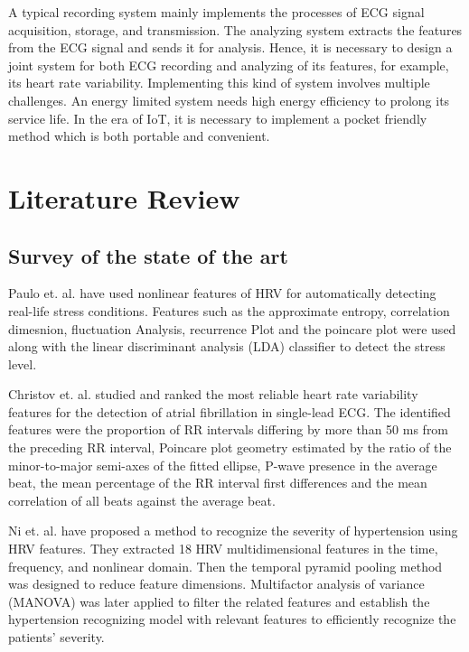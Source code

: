 \documentclass[11pt]{article}
\theoremstyle{definition}
\begin{document}
  A typical recording system mainly implements the processes of ECG signal acquisition, storage, and transmission.
  The analyzing system extracts the features from the ECG signal and sends it for analysis.
  Hence, it is necessary to design a joint system for both ECG recording and analyzing of its features, for example, its heart rate variability. Implementing this kind of system involves multiple challenges.
  An energy limited system needs high energy efficiency to prolong its service life.
  In the era of IoT, it is necessary to implement a pocket friendly method which is both portable and convenient.


  \section{Literature Review}
  \subsection{Survey of the state of the art}
  Paulo et. al.\cite{melillo_nonlinear_2011} have used nonlinear features of HRV for automatically detecting real-life stress conditions. Features such as the approximate entropy, correlation dimesnion, fluctuation Analysis, recurrence Plot and the poincare plot were used along with the linear discriminant analysis (LDA) classifier to detect the stress level.
  
  Christov et. al. \cite{christov_ranking_2018} studied and ranked the most reliable heart rate variability features for the detection of atrial fibrillation in single-lead ECG. The identified features were the proportion of RR intervals differing by more than 50 ms from the preceding RR interval, Poincare plot geometry estimated by the ratio of the minor-to-major semi-axes of the fitted ellipse, P-wave presence in the average beat, the mean percentage of the RR interval first differences and the mean correlation of all beats against the average beat. 
  
  Ni et. al.\cite{ni_multiscale_2019} have proposed a method to recognize the severity of hypertension using HRV features. They extracted 18 HRV multidimensional features in the time, frequency, and nonlinear domain. Then the temporal pyramid pooling method was designed to reduce feature dimensions. Multifactor analysis of variance (MANOVA) was later applied to filter the related features and establish the hypertension recognizing model with relevant features to efficiently recognize the patients’ severity.
  
\end{document}
